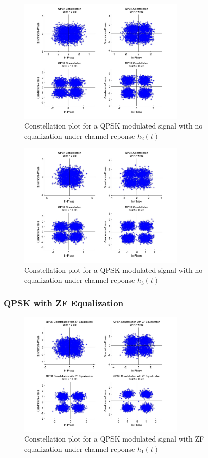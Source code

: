\documentclass[]{article}
\begin{document}
\begin{figure}[H]
\centering
\includegraphics[width=0.7\textwidth]{qpConst2.jpg}
\caption{Constellation plot for a QPSK modulated signal with no equalization under channel reponse $h_2(t)$}
\end{figure}

\begin{figure}[H]
\centering
\includegraphics[width=0.7\textwidth]{qpConst3.jpg}
\caption{Constellation plot for a QPSK modulated signal with no equalization under channel reponse $h_3(t)$}
\end{figure}

\subsubsection{QPSK with ZF Equalization}

\begin{figure}[H]
\centering
\includegraphics[width=0.7\textwidth]{qpConstZF1.jpg}
\caption{Constellation plot for a QPSK modulated signal with ZF equalization under channel reponse $h_1(t)$}
\end{figure}
\end{document}
